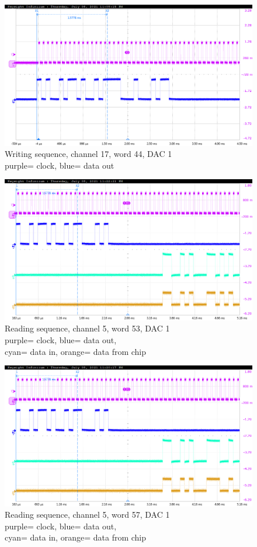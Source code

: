 \begin{figure}[H]
	\centering
	\includegraphics[width=0.6\linewidth]{IMG/ch5/probe/09-08-2021_ch17-write44-baselinedac1}
	\caption{Writing sequence, channel 17, word 44, DAC 1\\{\color{magenta}purple}= clock, {\color{blue}blue}= data out}
	\label{fig:ch17write44}
\end{figure}

\begin{figure}[H]
	\centering
	\includegraphics[width=0.6\linewidth]{IMG/ch5/probe/09-08-2021_ch05-read53-baselinedac1}
	\caption{Reading sequence, channel 5, word 53, DAC 1\\{\color{magenta}purple}= clock, {\color{blue}blue}= data out,\\{\color{cyan}cyan}= data in, {\color{orange}orange}= data from chip}
	\label{fig:ch05write53}
\end{figure}
\newpage
\thispagestyle{plain}
\begin{figure}[H]
	\centering
	\includegraphics[width=0.6\linewidth]{IMG/ch5/probe/09-08-2021_ch05-read57-baselinedac1}
	\caption{Reading sequence, channel 5, word 57, DAC 1\\{\color{magenta}purple}= clock, {\color{blue}blue}= data out,\\{\color{cyan}cyan}= data in, {\color{orange}orange}= data from chip}
	\label{fig:ch05write57}
\end{figure}

